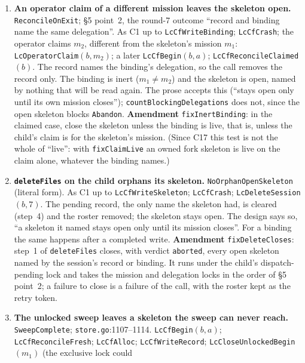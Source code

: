 \documentclass[a4paper,10pt,fleqn]{article}
\newcommand{\fpath}[1]{\texttt{#1}}
\newcommand{\field}[1]{\texttt{#1}}
\begin{document}
\begin{enumerate}
    written, refuse if the session is the supplied parent or an ancestor of
    it by the recorded chain, whether or not the ancestors have rosters.
  \item[\textbf{C4}] \textbf{An operator claim of a different mission leaves
    the skeleton open.} \field{ReconcileOnExit}; \S5 point~2, the round-7
    outcome ``record and binding name the same delegation''. As C1 up to
    \field{LcCfWriteBinding}; \field{LcCfCrash}; the operator claims $m_2$,
    different from the skeleton's mission $m_1$: \field{LcOperatorClaim}$(b,m_2)$;
    a later \field{LcCfBegin}$(b,a)$; \field{LcCfReconcileClaimed}$(b)$. The record
    names the binding's delegation, so the call removes the record only. The
    binding is inert ($m_1\neq m_2$) and the skeleton is open, named by
    nothing that will be read again. The prose accepts this (``stays open only
    until its own mission closes''); \field{countBlockingDelegations} does
    not, since the open skeleton blocks \field{Abandon}. \textbf{Amendment}
    \field{fixInertBinding}: in the claimed case, close the skeleton unless
    the binding is live, that is, unless the child's claim is for the
    skeleton's mission. (Since C17 this test is not the whole of ``live'':
    with \field{fixClaimLive} an owned fork skeleton is live on the claim
    alone, whatever the binding names.)
  \item[\textbf{C5}] \textbf{\field{deleteFiles} on the child orphans its
    skeleton.} \field{NoOrphanOpenSkeleton} (literal form). As C1 up to
    \field{LcCfWriteSkeleton}; \field{LcCfCrash}; \field{LcDeleteSession}$(b,7)$. The
    pending record, the only name the skeleton had, is cleared (step~4) and the
    roster removed; the skeleton stays open. The design says so, ``a skeleton
    it named stays open only until its mission closes''. For a binding the
    same happens after a completed write. \textbf{Amendment}
    \field{fixDeleteCloses}: step~1 of \field{deleteFiles} closes, with
    verdict \field{aborted}, every open skeleton named by the session's record
    or binding. It runs under the child's dispatch-pending lock and takes
    the mission and delegation locks in the order of \S5 point~2; a failure
    to close is a failure of the call, with the roster kept as the retry token.
  \item[\textbf{C6}] \textbf{The unlocked sweep leaves a skeleton the sweep
    can never reach.} \field{SweepComplete}; \fpath{store.go}:1107--1114.
    \field{LcCfBegin}$(b,a)$; \field{LcCfReconcileFresh}; \field{LcCfAlloc};
    \field{LcCfWriteRecord}; \field{LcCloseUnlockedBegin}$(m_1)$ (the exclusive lock could

\end{enumerate}
\end{document}
